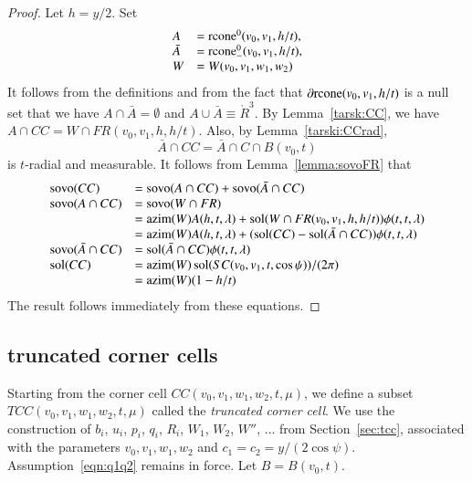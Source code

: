 \begin{proof}
Let $h=y/2$.  Set
$$
 \begin{array}{lll}
 A &= {\operatorname{rcone}}^0(v_0,v_1,h/t),\\
  \bar A &= {\operatorname{rcone}}^0_-(v_0,v_1,h/t),\\
 W &= W(v_0,v_1,w_1,w_2)\\
 \end{array}
$$
It follows from the definitions and from the
fact that $\partial{\operatorname{rcone}}(v_0,v_1,h/t)$
is a null set that
we have $A\cap \bar A = \emptyset$ and 
$A\cup \bar A \equiv \ring{R}^3$.
By Lemma~\ref{tarsk:CC}, we have 
$A\cap CC = W \cap FR(v_0,v_1,h,h/t)$.  
Also, by Lemma~\ref{tarski:CCrad}, 
$$\bar A \cap CC = \bar A \cap C \cap B(v_0,t)$$
is $t$-radial and measurable.
It follows from Lemma~\ref{lemma:sovoFR} that
$$
  \begin{array}{lll}
  {\operatorname{sovo}}(CC) &= {\operatorname{sovo}}(A\cap CC) + {\operatorname{sovo}}(\bar A\cap CC)\\
  {\operatorname{sovo}}(A\cap CC) &= {\operatorname{sovo}}(W\cap FR) \\
     &= {\operatorname{azim}}(W) A(h,t,\lambda) + \operatorname{sol}(W\cap FR(v_0,v_1,h,h/t))\phi(t,t,\lambda)\\
  &={\operatorname{azim}}(W) A(h,t,\lambda) + (\operatorname{sol}(CC)-\operatorname{sol}(\bar A \cap CC))\phi(t,t,\lambda)\\
  {\operatorname{sovo}}(\bar A \cap CC) &= \operatorname{sol}(\bar A \cap CC)\phi(t,t,\lambda)\\
  \operatorname{sol}(CC) &= {\operatorname{azim}}(W) \operatorname{sol}(SC(v_0,v_1,t,\cos\psi))/(2\pi) \\
         &={\operatorname{azim}}(W) (1-h/t)\\
  \end{array}
$$
The result follows immediately from these equations.
\end{proof}

\subsection{truncated corner cells}



Starting from the corner cell $CC(v_0,v_1,w_1,w_2,t,\mu)$, 
we define a subset $TCC(v_0,v_1,w_1,w_2,t,\mu)$ called
the {\it truncated corner cell}.  
We use the construction of $b_i$, $u_i$, $p_i$, $q_i$, $R_i$,
$W_1$, $W_2$, $W''$, $\ldots$ from Section~\ref{sec:tcc},
associated with the parameters $v_0,v_1,w_1,w_2$ and
$c_1=c_2 = y/(2\cos\psi)$.  Assumption~\ref{eqn:q1q2} remains
in force.  Let $B  = B(v_0,t)$.

